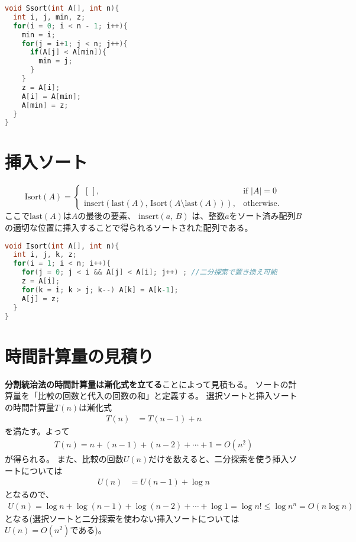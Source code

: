 \documentclass[a4paper,twoside,onecolumn,openany,article,10pt]{memoir}
\theoremstyle{remark}
\begin{document}
\begin{lstlisting}[basicstyle=\ttfamily\normalsize,showstringspaces=false,language=C,frame=single]
void Ssort(int A[], int n){
  int i, j, min, z;
  for(i = 0; i < n - 1; i++){
    min = i;
    for(j = i+1; j < n; j++){
      if(A[j] < A[min]){
        min = j;
      }
    }
    z = A[i];
    A[i] = A[min];
    A[min] = z;
  }
}
\end{lstlisting}

\section{挿入ソート}
\begin{equation*}
\mathrm{Isort}(A) =
\begin{cases}
[\,],&\text{if } |A| = 0\\
\mathrm{insert}(\mathrm{last}(A),\, \mathrm{Isort}(A \setminus \mathrm{last}(A))),& \text{otherwise.}
\end{cases}
\end{equation*}
ここで$\mathrm{last}(A)$は$A$の最後の要素、
$\mathrm{insert}(a,\, B)$
は、整数$a$をソート済み配列$B$の適切な位置に挿入することで得られるソートされた配列である。

\begin{lstlisting}[basicstyle=\ttfamily\normalsize,showstringspaces=false,language=C,frame=single]
void Isort(int A[], int n){
  int i, j, k, z;
  for(i = 1; i < n; i++){
    for(j = 0; j < i && A[j] < A[i]; j++) ; //二分探索で置き換え可能
    z = A[i];
    for(k = i; k > j; k--) A[k] = A[k-1];
    A[j] = z;
  }
}
\end{lstlisting}

\section{時間計算量の見積り}
\textbf{分割統治法の時間計算量は漸化式を立てる}ことによって見積もる。
ソートの計算量を「比較の回数と代入の回数の和」と定義する。
選択ソートと挿入ソートの時間計算量$T(n)$は漸化式
\begin{align*}
T(n) &= T(n-1) + n
\end{align*}
を満たす。よって
\begin{align*}
T(n) = n + (n-1) + (n-2) + \dotsb + 1 = O(n^2)
\end{align*}
が得られる。
また、比較の回数$U(n)$だけを数えると、二分探索を使う挿入ソートについては
\begin{align*}
U(n) &= U(n-1) + \log n
\end{align*}
となるので、
\begin{align*}
U(n) = \log n + \log (n-1) + \log (n-2) + \dotsb + \log 1 = \log n! \le \log n^n = O(n\log n)
\end{align*}
となる(選択ソートと二分探索を使わない挿入ソートについては$U(n)=O(n^2)$である)。
\end{document}
